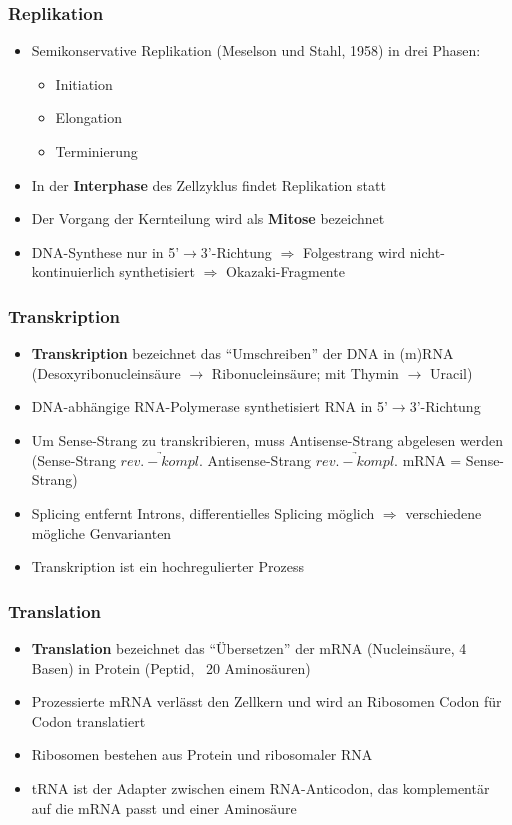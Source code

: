 \subsubsection{Replikation}
\begin{itemize}
    \item Semikonservative Replikation (Meselson und Stahl, 1958) in drei Phasen:
        \begin{itemize}
            \item Initiation
            \item Elongation
            \item Terminierung
        \end{itemize}
    \item In der \textbf{Interphase} des Zellzyklus findet Replikation statt
    \item Der Vorgang der Kernteilung wird als \textbf{Mitose} bezeichnet
    \item DNA-Synthese nur in 5'$\rightarrow$3'-Richtung $\Rightarrow$ Folgestrang wird nicht-kontinuierlich synthetisiert $\Rightarrow$ Okazaki-Fragmente
\end{itemize}

\subsubsection{Transkription}
\begin{itemize}
    \item \textbf{Transkription} bezeichnet das ``Umschreiben'' der DNA in (m)RNA (Desoxyribonucleinsäure $\rightarrow$ Ribonucleinsäure; mit Thymin $\rightarrow$ Uracil)
    \item DNA-abhängige RNA-Polymerase synthetisiert RNA in 5'$\rightarrow$3'-Richtung
    \item Um Sense-Strang zu transkribieren, muss Antisense-Strang abgelesen werden (Sense-Strang $\underrightarrow{rev.-kompl.}$ Antisense-Strang $\underrightarrow{rev.-kompl.}$ mRNA = Sense-Strang)
    \item Splicing entfernt Introns, differentielles Splicing möglich $\Rightarrow$ verschiedene mögliche Genvarianten
    \item Transkription ist ein hochregulierter Prozess
\end{itemize}

\subsubsection{Translation}
\begin{itemize}
    \item \textbf{Translation} bezeichnet das ``Übersetzen'' der mRNA (Nucleinsäure, 4 Basen) in Protein (Peptid, ~20 Aminosäuren)
    \item Prozessierte mRNA verlässt den Zellkern und wird an Ribosomen Codon für Codon translatiert
    \item Ribosomen bestehen aus Protein und ribosomaler RNA
    \item tRNA ist der Adapter zwischen einem RNA-Anticodon, das komplementär auf die mRNA passt und einer Aminosäure
\end{itemize}

